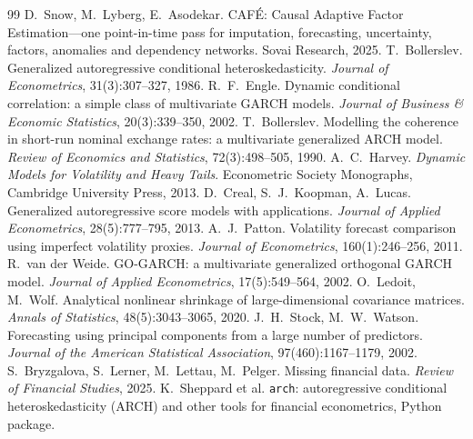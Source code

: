 \documentclass[10pt,twocolumn]{article}
\newcommand{\cafe}{CAF\'E}
\begin{document}
\begin{thebibliography}{99}\small\setlength{\itemsep}{0pt}
 D.~Snow, M.~Lyberg, E.~Asodekar. \cafe{}: Causal Adaptive
Factor Estimation---one point-in-time pass for imputation, forecasting, uncertainty,
factors, anomalies and dependency networks. Sovai Research, 2025.
 T.~Bollerslev. Generalized autoregressive conditional
heteroskedasticity. \emph{Journal of Econometrics}, 31(3):307--327, 1986.
 R.~F.~Engle. Dynamic conditional correlation: a simple class of
multivariate GARCH models. \emph{Journal of Business \& Economic Statistics},
20(3):339--350, 2002.
 T.~Bollerslev. Modelling the coherence in short-run nominal
exchange rates: a multivariate generalized ARCH model. \emph{Review of Economics and
Statistics}, 72(3):498--505, 1990.
 A.~C.~Harvey. \emph{Dynamic Models for Volatility and Heavy Tails}.
Econometric Society Monographs, Cambridge University Press, 2013.
 D.~Creal, S.~J.~Koopman, A.~Lucas. Generalized autoregressive
score models with applications. \emph{Journal of Applied Econometrics},
28(5):777--795, 2013.
 A.~J.~Patton. Volatility forecast comparison using imperfect
volatility proxies. \emph{Journal of Econometrics}, 160(1):246--256, 2011.
 R.~van der Weide. GO-GARCH: a multivariate generalized
orthogonal GARCH model. \emph{Journal of Applied Econometrics}, 17(5):549--564, 2002.
 O.~Ledoit, M.~Wolf. Analytical nonlinear shrinkage of
large-dimensional covariance matrices. \emph{Annals of Statistics}, 48(5):3043--3065, 2020.
 J.~H.~Stock, M.~W.~Watson. Forecasting using principal
components from a large number of predictors. \emph{Journal of the American
Statistical Association}, 97(460):1167--1179, 2002.
 S.~Bryzgalova, S.~Lerner, M.~Lettau, M.~Pelger. Missing
financial data. \emph{Review of Financial Studies}, 2025.
 K.~Sheppard et al. \texttt{arch}: autoregressive conditional
heteroskedasticity (ARCH) and other tools for financial econometrics, Python package.
\end{thebibliography}
\end{document}
